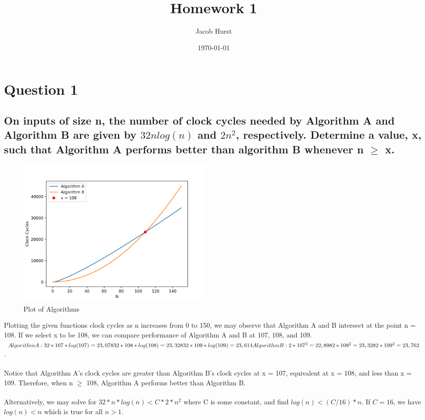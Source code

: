 \documentclass[11pt]{article}
\title{ Homework 1 }
\author{ Jacob Hurst }
\date{\today}
\begin{document}
\maketitle
\clearpage

\section{Question 1}
\subsection{On inputs of size n, the number of clock cycles needed by Algorithm A and Algorithm B are given by $ 32nlog(n) $ and $ 2n^2 $, respectively. Determine a value, x, such that Algorithm A performs better than algorithm B whenever n $\geq$ x. }

\begin{figure}
  \begin{center}
    \includegraphics[width=0.48\textwidth]{q1.png}
  \end{center}
  \caption{Plot of Algorithms}
\end{figure}

 Plotting the given functions clock cycles as n increases from 0 to 150,
 we may observe that Algorithm A and B intersect at the point n = 108. If we select x to be 108, we can compare performance of Algorithm A and B at 107, 108, and 109. \\$ Algorithm A:\\32*107*log(107) = 23,078\\32*108*log(108) = 23,328\\32*109*log(109) = 23,614\\Algorithm B:\\2*107^2 = 22,898\\2*108^2 = 23,328\\2*109^2 = 23,762$. \\\\Notice that Algorithm A's clock cycles are greater than Algorithm B's clock cycles at x = 107, equivalent at x = 108, and less than x = 109. Therefore, when n $\geq$ 108, Algorithm A performs better than Algorithm B. 
\\\\Alternatively, we may solve for $ 32*n*log(n) < C*2*n^2 $ where C is some constant, and find $log(n) < (C/16)*n$. If $C=16$, we have $log(n) < n$ which is true for all $n > 1$.
\end{document}
